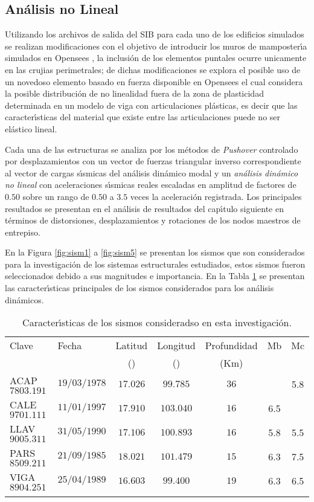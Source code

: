 \newpage

\subsection{An\'alisis no Lineal}

Utilizando los archivos de salida del SIB para cada uno de los edificios simulados se realizan modificaciones con el objetivo de introducir los muros de mamposter\'{\i}a simulados en Opensees \cite{OP2006}, la inclusi\'on de los elementos puntales ocurre unicamente en las crujias perimetrales; de dichas modificaciones se explora el posible uso de un novedoso elemento basado en fuerza disponible en Opensees \cite{MG2006} el cual considera la posible distribuci\'on de no linealidad fuera de la zona de plasticidad determinada en un modelo de viga con articulaciones pl\'asticas, es decir que las caracter\'{\i}sticas del material que existe entre las articulaciones puede no ser el\'astico lineal.

Cada una de las estructuras se analiza por los m\'etodos de \emph{Pushover} controlado por desplazamientos con un vector de fuerzas triangular inverso correspondiente al vector de cargas s\'{\i}smicas del an\'alisis din\'amico modal y un \emph{an\'alisis din\'amico no lineal} con aceleraciones s\'{\i}smicas reales escaladas en amplitud de factores de $0.50$ sobre un rango de $0.50$ a $3.5$ veces la aceleraci\'on registrada. Los principales resultados se presentan en el an\'alisis de resultados del cap\'{\i}tulo siguiente en t\'erminos de distorsiones, desplazamientos y rotaciones de los nodos maestros de entrepiso.

En la Figura \ref{fig:sism1} a \ref{fig:sism5} se presentan los sismos que son considerados para la investigaci\'on de los sistemas estructurales estudiados, estos sismos fueron seleccionados debido a sus magnitudes e importancia. En la Tabla \ref{tab:csis} se presentan las caracter\'{\i}sticas principales de los sismos considerados para los an\'alisis din\'amicos.

	\begin{table}
		\centering
		\caption{Caracter\'{\i}sticas de los sismos consideradso en esta investigaci\'on.}
		\begin{tabular}{llccccc} \\ 
			\hline \hline
	  Clave & Fecha & Latitud & Longitud & Profundidad & Mb & Mc \\ 
	   &  & (\circ) & (\circ) & (Km) & & \\
		\hline\hline
	  ACAP$7803.191$ & $19/03/1978$ & $17.026$ & $99.785$ & $36$ &  & 5.8 \\
	  CALE$9701.111$ & $11/01/1997$ & $17.910$ & $103.040$ & $16$ & 6.5 & \\
	  LLAV$9005.311$ & $31/05/1990$ & $17.106$ & $100.893$ & $16$ & 5.8 & 5.5 \\
	  PARS$8509.211$ & $21/09/1985$ & $18.021$ & $101.479$ & $15$ & 6.3 & 7.5 \\
	  VIGA$8904.251$ & $25/04/1989$ & $16.603$ & $99.400$ & $19$ & 6.3 & 6.5 \\
\\\hline \hline
		\end{tabular}
	\label{tab:csis}
\end{table}

